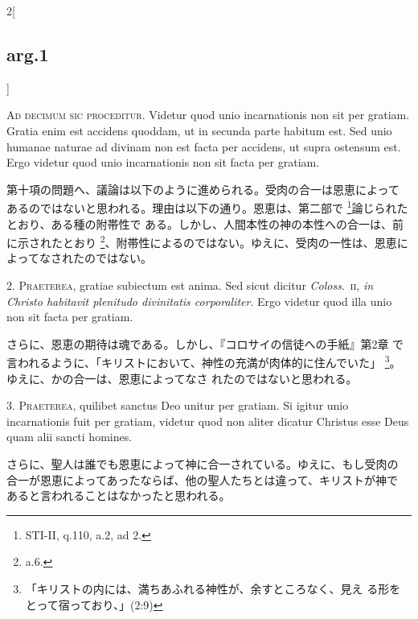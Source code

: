 \documentclass[paper=a4paper,fontsize=10pt,jafontsize=9pt,titlepage]{jlreq}
\begin{document}
\begin{paracol}{2}[\subsection{arg.1}]

{\Huge A}{\scshape d decimum sic proceditur}. Videtur quod unio
incarnationis non sit per gratiam. Gratia enim est accidens quoddam,
ut in secunda parte habitum est. Sed unio humanae naturae ad divinam
non est facta per accidens, ut supra ostensum est. Ergo videtur quod
unio incarnationis non sit facta per gratiam.

\switchcolumn

第十項の問題へ、議論は以下のように進められる。受肉の合一は恩恵によって
あるのではないと思われる。理由は以下の通り。恩恵は、第二部で
\footnote{STI-II, q.110, a.2, ad 2.}論じられたとおり、ある種の附帯性で
ある。しかし、人間本性の神の本性への合一は、前に示されたとおり
\footnote{a.6.}、附帯性によるのではない。ゆえに、受肉の一性は、恩恵に
よってなされたのではない。


2. {\scshape Praeterea}, gratiae subiectum est anima. Sed sicut
dicitur {\itshape Coloss}.~{\scshape ii}, {\itshape in Christo
habitavit plenitudo divinitatis corporaliter}. Ergo videtur quod illa
unio non sit facta per gratiam.

\switchcolumn

さらに、恩恵の期待は魂である。しかし、『コロサイの信徒への手紙』第2章
で言われるように、「キリストにおいて、神性の充満が肉体的に住んでいた」
\footnote{「キリストの内には、満ちあふれる神性が、余すところなく、見え
る形をとって宿っており、」(2:9)}。ゆえに、かの合一は、恩恵によってなさ
れたのではないと思われる。


3. {\scshape Praeterea}, quilibet sanctus Deo unitur per gratiam. Si
igitur unio incarnationis fuit per gratiam, videtur quod non aliter
dicatur Christus esse Deus quam alii sancti homines.

\switchcolumn

さらに、聖人は誰でも恩恵によって神に合一されている。ゆえに、もし受肉の
合一が恩恵によってあったならば、他の聖人たちとは違って、キリストが神で
あると言われることはなかったと思われる。


\end{paracol}
\end{document}
